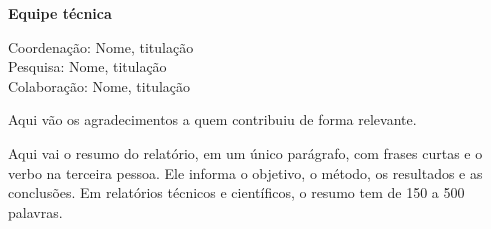 \documentclass[12pt,a4paper,oneside]{article}
\begin{document}
\thispagestyle{empty}
\noindent\textbf{Equipe técnica}\par\vspace{0.5\baselineskip}
\noindent Coordenação: Nome, titulação\\
Pesquisa: Nome, titulação\\
Colaboração: Nome, titulação
\vspace*{\fill}
\begin{center}
\end{center}
\clearpage\addtocounter{page}{-1}


\begin{agradecimentos}
  Aqui vão os agradecimentos a quem contribuiu de forma relevante.
\end{agradecimentos}

\begin{resumo}
Aqui vai o resumo do relatório, em um único parágrafo, com frases curtas e o verbo na terceira pessoa. Ele informa o objetivo, o método, os resultados e as conclusões. Em relatórios técnicos e científicos, o resumo tem de 150 a 500 palavras.
\end{resumo}

\listadefiguras
\listadetabelas

\sumario

\textual
\end{document}
